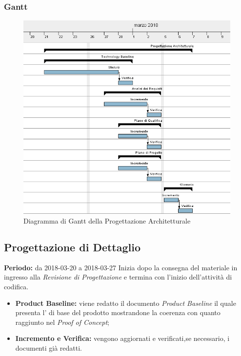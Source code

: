 \subsubsection{Gantt}
\begin{figure}[H]
	\centering 
	\includegraphics[width=1\textwidth]{images/Progettazione-Architetturale.png}
	\caption{Diagramma di Gantt della Progettazione Architetturale}
	\label{graficobello3} 
\end{figure}
\subsection{Progettazione di Dettaglio}
    \textbf{Periodo:} da 2018-03-20 a 2018-03-27\Spazio
    Inizia dopo la consegna del materiale in ingresso alla \emph{Revisione di Progettazione} e termina con l'inizio dell'attività di codifica.
    \begin{itemize}
    	\item \textbf{Product Baseline:} viene redatto il documento \emph{Product Baseline} il quale presenta l' di base del prodotto mostrandone la coerenza con quanto raggiunto nel \emph{Proof of Concept};
    	\item \textbf{Incremento e Verifica:} vengono aggiornati e verificati,se necessario, i documenti già redatti.
    \end{itemize}
